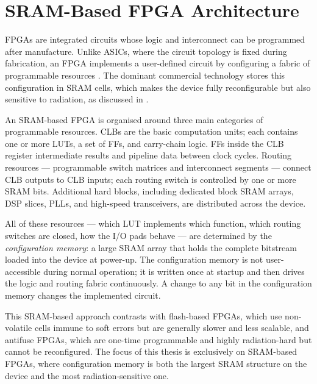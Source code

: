 \label{chap2:platform_foundation}



\section{SRAM-Based FPGA Architecture}
\label{chap2:fpga_arch}

\acp{FPGA} are integrated circuits whose logic and interconnect can be programmed after manufacture. Unlike \acp{ASIC}, where the circuit topology is fixed during fabrication, an \ac{FPGA} implements a user-defined circuit by configuring a fabric of programmable resources \cite{Kastensmidt2006}. The dominant commercial technology stores this configuration in \ac{SRAM} cells, which makes the device fully reconfigurable but also sensitive to radiation, as discussed in .

An \ac{SRAM}-based \ac{FPGA} is organised around three main categories of programmable resources. \acp{CLB} are the basic computation units; each contains one or more \acp{LUT}, a set of \acp{FF}, and carry-chain logic. \acp{FF} inside the \ac{CLB} register intermediate results and pipeline data between clock cycles. Routing resources — programmable switch matrices and interconnect segments — connect \ac{CLB} outputs to \ac{CLB} inputs; each routing switch is controlled by one or more \ac{SRAM} bits. Additional hard blocks, including dedicated block \ac{SRAM} arrays, \ac{DSP} slices, \acp{PLL}, and high-speed transceivers, are distributed across the device.

All of these resources — which \ac{LUT} implements which function, which routing switches are closed, how the \ac{I/O} pads behave — are determined by the \emph{configuration memory}: a large \ac{SRAM} array that holds the complete bitstream loaded into the device at power-up. The configuration memory is not user-accessible during normal operation; it is written once at startup and then drives the logic and routing fabric continuously. A change to any bit in the configuration memory changes the implemented circuit.

This \ac{SRAM}-based approach contrasts with flash-based \acp{FPGA}, which use non-volatile cells immune to soft errors but are generally slower and less scalable, and antifuse \acp{FPGA}, which are one-time programmable and highly radiation-hard but cannot be reconfigured. The focus of this thesis is exclusively on \ac{SRAM}-based \acp{FPGA}, where configuration memory is both the largest \ac{SRAM} structure on the device and the most radiation-sensitive one.


